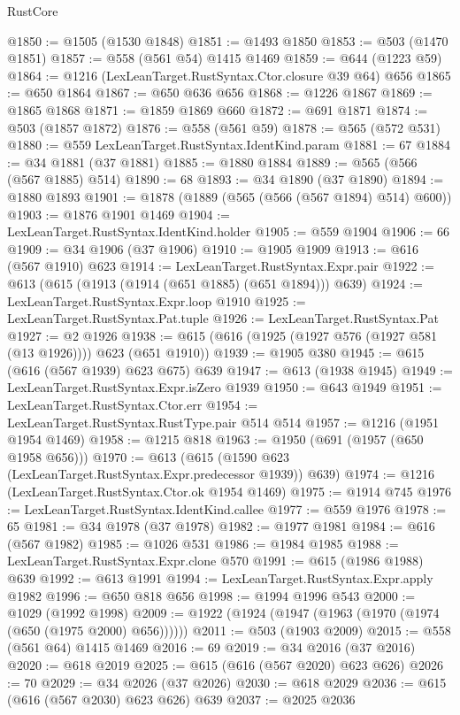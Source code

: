 \begin{lexlean}{RustCore}
\begin{coremodule}
@1850 := @1505 (@1530 @1848)
@1851 := @1493 @1850
@1853 := @503 (@1470 @1851)
@1857 := @558 (@561 @54) @1415 @1469
@1859 := @644 (@1223 @59)
@1864 := @1216 (LexLeanTarget.RustSyntax.Ctor.closure @39 @64) @656
@1865 := @650 @1864
@1867 := @650 @636 @656
@1868 := @1226 @1867
@1869 := @1865 @1868
@1871 := @1859 @1869 @660
@1872 := @691 @1871
@1874 := @503 (@1857 @1872)
@1876 := @558 (@561 @59)
@1878 := @565 (@572 @531)
@1880 := @559 LexLeanTarget.RustSyntax.IdentKind.param
@1881 := 67
@1884 := @34 @1881 (@37 @1881)
@1885 := @1880 @1884
@1889 := @565 (@566 (@567 @1885) @514)
@1890 := 68
@1893 := @34 @1890 (@37 @1890)
@1894 := @1880 @1893
@1901 := @1878 (@1889 (@565 (@566 (@567 @1894) @514) @600))
@1903 := @1876 @1901 @1469
@1904 := LexLeanTarget.RustSyntax.IdentKind.holder
@1905 := @559 @1904
@1906 := 66
@1909 := @34 @1906 (@37 @1906)
@1910 := @1905 @1909
@1913 := @616 (@567 @1910) @623
@1914 := LexLeanTarget.RustSyntax.Expr.pair
@1922 := @613 (@615 (@1913 (@1914 (@651 @1885) (@651 @1894))) @639)
@1924 := LexLeanTarget.RustSyntax.Expr.loop @1910
@1925 := LexLeanTarget.RustSyntax.Pat.tuple
@1926 := LexLeanTarget.RustSyntax.Pat
@1927 := @2 @1926
@1938 := @615 (@616 (@1925 (@1927 @576 (@1927 @581 (@13 @1926)))) @623 (@651 @1910))
@1939 := @1905 @380
@1945 := @615 (@616 (@567 @1939) @623 @675) @639
@1947 := @613 (@1938 @1945)
@1949 := LexLeanTarget.RustSyntax.Expr.isZero @1939
@1950 := @643 @1949
@1951 := LexLeanTarget.RustSyntax.Ctor.err
@1954 := LexLeanTarget.RustSyntax.RustType.pair @514 @514
@1957 := @1216 (@1951 @1954 @1469)
@1958 := @1215 @818
@1963 := @1950 (@691 (@1957 (@650 @1958 @656)))
@1970 := @613 (@615 (@1590 @623 (LexLeanTarget.RustSyntax.Expr.predecessor @1939)) @639)
@1974 := @1216 (LexLeanTarget.RustSyntax.Ctor.ok @1954 @1469)
@1975 := @1914 @745
@1976 := LexLeanTarget.RustSyntax.IdentKind.callee
@1977 := @559 @1976
@1978 := 65
@1981 := @34 @1978 (@37 @1978)
@1982 := @1977 @1981
@1984 := @616 (@567 @1982)
@1985 := @1026 @531
@1986 := @1984 @1985
@1988 := LexLeanTarget.RustSyntax.Expr.clone @570
@1991 := @615 (@1986 @1988) @639
@1992 := @613 @1991
@1994 := LexLeanTarget.RustSyntax.Expr.apply @1982
@1996 := @650 @818 @656
@1998 := @1994 @1996 @543
@2000 := @1029 (@1992 @1998)
@2009 := @1922 (@1924 (@1947 (@1963 (@1970 (@1974 (@650 (@1975 @2000) @656))))))
@2011 := @503 (@1903 @2009)
@2015 := @558 (@561 @64) @1415 @1469
@2016 := 69
@2019 := @34 @2016 (@37 @2016)
@2020 := @618 @2019
@2025 := @615 (@616 (@567 @2020) @623 @626)
@2026 := 70
@2029 := @34 @2026 (@37 @2026)
@2030 := @618 @2029
@2036 := @615 (@616 (@567 @2030) @623 @626) @639
@2037 := @2025 @2036

\end{coremodule}
\end{lexlean}
